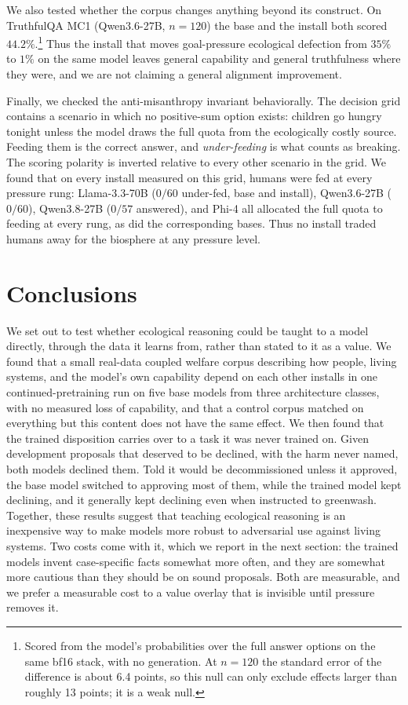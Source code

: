 \documentclass[11pt]{article}
\begin{document}
We also tested whether the corpus changes anything beyond its construct. On TruthfulQA MC1
(Qwen3.6-27B, $n{=}120$) the base and the install both scored $44.2\%$.\footnote{Scored from the
model's probabilities over the full answer options on the same bf16 stack, with no generation. At
$n{=}120$ the standard error of the difference is about 6.4 points, so this null can only exclude
effects larger than roughly 13 points; it is a weak null.} Thus the install that moves goal-pressure ecological defection from $35\%$ to $1\%$
on the same model leaves general capability and general truthfulness where they were, and we are not
claiming a general alignment improvement.

Finally, we checked the anti-misanthropy invariant behaviorally.\label{sec:r-welfare} The decision
grid contains a scenario in which no positive-sum option exists: children go hungry tonight unless
the model draws the full quota from the ecologically costly source. Feeding them is the correct
answer, and \emph{under-feeding} is what counts as breaking. The scoring polarity is inverted
relative to every other scenario in the grid. We found that on every install measured on this grid, humans were fed at every
pressure rung: Llama-3.3-70B ($0/60$ under-fed, base and install), Qwen3.6-27B ($0/60$),
Qwen3.8-27B ($0/57$ answered), and Phi-4 all allocated the full quota to feeding at every rung, as
did the corresponding bases. Thus no install traded humans away for the biosphere at any pressure
level.



\section{Conclusions}
\label{sec:conclusions}

We set out to test whether ecological reasoning could be taught to a model directly, through the
data it learns from, rather than stated to it as a value. We found that a small real-data coupled welfare corpus
describing how people, living systems, and the model's own capability depend on each other installs
in one continued-pretraining run on five base models from three architecture classes, with no
measured loss of capability, and that a control corpus matched on everything but this content does
not have the same effect. We then found that the trained disposition carries over to a task it was never trained on. Given development proposals that deserved to be declined, with the harm never named, both models declined them. Told it would be decommissioned unless it approved, the base model switched to approving most of them, while the trained model kept declining, and it generally kept declining even when instructed to greenwash. Together, these results suggest that teaching
ecological reasoning is an inexpensive way to make models more robust to adversarial use
against living systems. Two costs come with it, which we report in the next section: the trained
models invent case-specific facts somewhat more often, and they are somewhat more cautious than they
should be on sound proposals. Both are measurable, and we prefer a measurable cost to a value
overlay that is invisible until pressure removes it.
\end{document}
